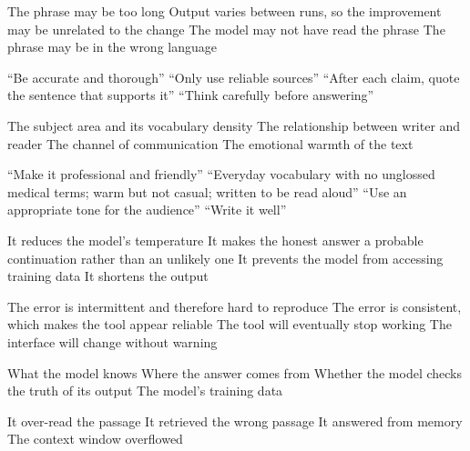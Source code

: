 \documentclass[11pt,a4paper]{article}
\begin{document}
\begin{questions}
  {The phrase may be too long}
  {Output varies between runs, so the improvement may be unrelated to the change}
  {The model may not have read the phrase}
  {The phrase may be in the wrong language}

  {``Be accurate and thorough''}
  {``Only use reliable sources''}
  {``After each claim, quote the sentence that supports it''}
  {``Think carefully before answering''}

  {The subject area and its vocabulary density}
  {The relationship between writer and reader}
  {The channel of communication}
  {The emotional warmth of the text}

  {``Make it professional and friendly''}
  {``Everyday vocabulary with no unglossed medical terms; warm but not casual; written to be read aloud''}
  {``Use an appropriate tone for the audience''}
  {``Write it well''}

  {It reduces the model's temperature}
  {It makes the honest answer a probable continuation rather than an unlikely one}
  {It prevents the model from accessing training data}
  {It shortens the output}

  {The error is intermittent and therefore hard to reproduce}
  {The error is consistent, which makes the tool appear reliable}
  {The tool will eventually stop working}
  {The interface will change without warning}

  {What the model knows}
  {Where the answer comes from}
  {Whether the model checks the truth of its output}
  {The model's training data}

  {It over-read the passage}
  {It retrieved the wrong passage}
  {It answered from memory}
  {The context window overflowed}

\end{questions}
\end{document}

